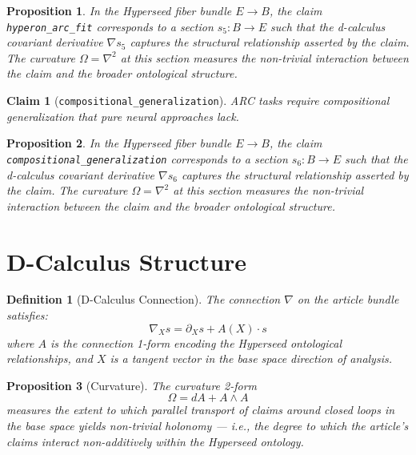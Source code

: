 \documentclass{article}
\newtheorem{claim}{Claim}
\newtheorem{definition}{Definition}
\newtheorem{proposition}{Proposition}
\begin{document}
\begin{proposition}
In the Hyperseed fiber bundle $E \to B$, the claim \texttt{hyperon_arc_fit} corresponds to a section $s_5: B \to E$ such that the d-calculus covariant derivative $\nabla s_5$ captures the structural relationship asserted by the claim. The curvature $\Omega = \nabla^2$ at this section measures the non-trivial interaction between the claim and the broader ontological structure.
\end{proposition}

\begin{claim}[\texttt{compositional_generalization}]
ARC tasks require compositional generalization that pure neural approaches lack.
\end{claim}

\begin{proposition}
In the Hyperseed fiber bundle $E \to B$, the claim \texttt{compositional_generalization} corresponds to a section $s_6: B \to E$ such that the d-calculus covariant derivative $\nabla s_6$ captures the structural relationship asserted by the claim. The curvature $\Omega = \nabla^2$ at this section measures the non-trivial interaction between the claim and the broader ontological structure.
\end{proposition}

\section{D-Calculus Structure}

\begin{definition}[D-Calculus Connection]
The connection $\nabla$ on the article bundle satisfies:
\begin{equation}
  \nabla_X s = \partial_X s + A(X) \cdot s
\end{equation}
where $A$ is the connection 1-form encoding the Hyperseed ontological relationships, and $X$ is a tangent vector in the base space direction of analysis.
\end{definition}

\begin{proposition}[Curvature]
The curvature 2-form
\begin{equation}
  \Omega = dA + A \wedge A
\end{equation}
measures the extent to which parallel transport of claims around closed loops in the base space yields non-trivial holonomy --- i.e., the degree to which the article's claims interact non-additively within the Hyperseed ontology.
\end{proposition}
\end{document}

